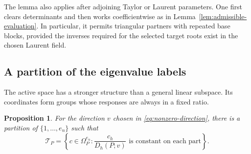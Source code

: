 \documentclass[11pt]{article}
\newtheorem{proposition}[theorem]{Proposition}
\theoremstyle{definition}
\theoremstyle{remark}
\numberwithin{equation}{section}
\begin{document}
The lemma also applies after adjoining Taylor or Laurent parameters.
One first clears determinants and then works coefficientwise as in
Lemma~\ref{lem:admissible-evaluation}.  In particular, it permits
triangular partners with repeated base blocks, provided the inverses
required for the selected target roots exist in the chosen Laurent
field.

\subsection{A partition of the eigenvalue labels}
\label{subsec:active-partition}

The active space has a stronger structure than a general linear
subspace.  Its coordinates form groups whose responses are always in
a fixed ratio.

\begin{proposition}\label{prop:active-partition}
For the direction $v$ chosen in \eqref{eq:nonzero-direction}, there
is a partition of $\{1,\ldots,e_n\}$ such that
\[
 \mathcal T_P=
 \left\{c\in\Omega_P^{e_n}:
 \frac{c_h}{D_h(P;v)}\text{ is constant on each part}\right\}.
\]
\end{proposition}
\end{document}
